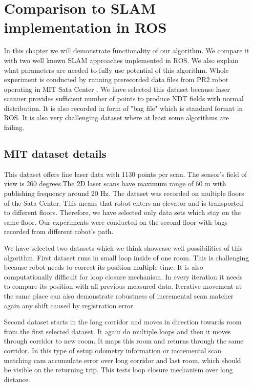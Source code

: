 \chapter{Comparison to SLAM implementation in ROS}
In this chapter we will demonstrate functionality of our algorithm. We compare it with two well known \gls{SLAM} approaches implemented in \gls{ROS}. We also explain what parameters are needed to fully use potential of this algorithm. Whole experiment is conducted by running prerecorded data files from PR2 robot operating in \gls{MIT} Sata Center \cite{MITDataset}. We have selected this dataset because laser scanner provides sufficient number of points to produce \gls{NDT} fields with normal distribution. It is also recorded in form of "bag file" which is standard format in \gls{ROS}. It is also very challenging dataset where at least some algorithms are failing.

\section {MIT dataset details}
This dataset offers fine laser data with 1130 points per scan. The sensor's field of view is 260 degrees.The 2D laser scans have maximum range of 60 m with publishing frequency around 20 Hz. The dataset was recorded on multiple floors of the Sata Center. This means that robot enters an elevator and is transported to different floors. Therefore, we have selected only data sets which stay on the same floor. Our experiments were conducted on the second floor with bags recorded from different robot's path. 

We have selected two datasets which we think showcase well possibilities of this algorithm. First dataset runs in small loop inside of one room. This is challenging because robot needs to correct its position multiple time. It is also computationally difficult for loop closure mechanism. In every iteration it needs to compare its position with all previous measured data. Iterative movement at the same place can also demonstrate robustness of incremental scan matcher again any shift caused by registration error.

Second dataset starts in the long corridor and moves in direction towards room from the first selected dataset. It again do multiple loops and then it moves through corridor to new room. It maps this room and returns through the same corridor. In this type of setup odometry information or incremental scan matching cam accumulate error over long corridor and last room, which should be visible on the returning trip. This tests loop closure mechanism over long distance.


